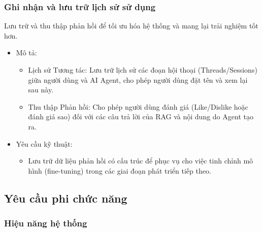 \subsubsection{Ghi nhận và lưu trữ lịch sử sử
dụng}\label{ghi-nhux1eadn-vuxe0-lux1b0u-trux1eef-lux1ecbch-sux1eed-sux1eed-dux1ee5ng}

Lưu trữ và thu thập phản hồi để tối ưu hóa hệ thống và mang lại trải
nghiệm tốt hơn.

\begin{itemize}
\item
  Mô tả:

  \begin{itemize}
  \item
    Lịch sử Tương tác: Lưu trữ lịch sử các đoạn hội thoại
    (Threads/Sessions) giữa người dùng và AI Agent, cho phép người dùng
    đặt tên và xem lại sau này.
  \item
    Thu thập Phản hồi: Cho phép người dùng đánh giá (Like/Dislike hoặc
    đánh giá sao) đối với các câu trả lời của RAG và nội dung do Agent
    tạo ra.
  \end{itemize}
\item
  Yêu cầu kỹ thuật:

  \begin{itemize}
  \item
    Lưu trữ dữ liệu phản hồi có cấu trúc để phục vụ cho việc tinh chỉnh
    mô hình (fine-tuning) trong các giai đoạn phát triển tiếp theo.
  \end{itemize}
\end{itemize}

\subsection{Yêu cầu phi chức
năng}\label{yuxeau-cux1ea7u-phi-chux1ee9c-nux103ng}

\subsubsection{Hiệu năng hệ
thống}\label{hiux1ec7u-nux103ng-hux1ec7-thux1ed1ng}

